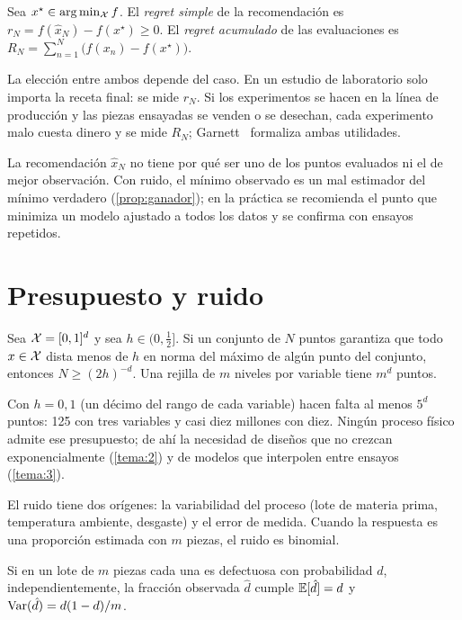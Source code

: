 \begin{definicion}[Regret]\label{def:regret}
Sea $x^\star\in\arg\min_{\mathcal{X}}f$. El \emph{regret simple} de la recomendación es $r_N=f(\hat x_N)-f(x^\star)\ge 0$. El \emph{regret acumulado} de las evaluaciones es $R_N=\sum_{n=1}^{N}\bigl(f(x_n)-f(x^\star)\bigr)$.
\end{definicion}

La elección entre ambos depende del caso. En un estudio de laboratorio solo importa la receta final: se mide $r_N$. Si los experimentos se hacen en la línea de producción y las piezas ensayadas se venden o se desechan, cada experimento malo cuesta dinero y se mide $R_N$; Garnett~\cite[§6.1–6.2]{garnett} formaliza ambas utilidades.

\begin{observacion}
La recomendación $\hat x_N$ no tiene por qué ser uno de los puntos evaluados ni el de mejor observación. Con ruido, el mínimo observado es un mal estimador del mínimo verdadero (\cref{prop:ganador}); en la práctica se recomienda el punto que minimiza un modelo ajustado a todos los datos y se confirma con ensayos repetidos.
\end{observacion}

\section{Presupuesto y ruido}

\begin{proposicion}\label{prop:rejilla}
Sea $\mathcal{X}=[0,1]^{d}$ y sea $h\in(0,\tfrac12]$. Si un conjunto de $N$ puntos garantiza que todo $x\in\mathcal{X}$ dista menos de $h$ en norma del máximo de algún punto del conjunto, entonces $N\ge(2h)^{-d}$. Una rejilla de $m$ niveles por variable tiene $m^{d}$ puntos.
\end{proposicion}

Con $h=0{,}1$ (un décimo del rango de cada variable) hacen falta al menos $5^{d}$ puntos: 125 con tres variables y casi diez millones con diez. Ningún proceso físico admite ese presupuesto; de ahí la necesidad de diseños que no crezcan exponencialmente (\cref{tema:2}) y de modelos que interpolen entre ensayos (\cref{tema:3}).

El ruido tiene dos orígenes: la variabilidad del proceso (lote de materia prima, temperatura ambiente, desgaste) y el error de medida. Cuando la respuesta es una proporción estimada con $m$ piezas, el ruido es binomial.

\begin{proposicion}\label{prop:binomial}
Si en un lote de $m$ piezas cada una es defectuosa con probabilidad $d$, independientemente, la fracción observada $\hat d$ cumple $\mathbb{E}[\hat d]=d$ y $\operatorname{Var}(\hat d)=d(1-d)/m$.
\end{proposicion}

